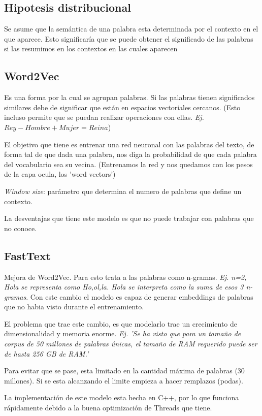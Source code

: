 \documentclass[titlepage,a4paper]{article}
\begin{document}
\subsection{Hipotesis distribucional}
Se asume que la semántica de una palabra esta determinada por el contexto en el que aparece. Esto significaría que se puede obtener el significado de las palabras si las resumimos en los contextos en las cuales aparecen


\subsection{Word2Vec}

Es una forma por la cual se agrupan palabras. Si las palabras tienen significados similares debe de significar que están en espacios vectoriales cercanos. (Esto incluso permite que se puedan realizar operaciones con ellas. \textit{Ej. $Rey - Hombre + Mujer = Reina$})

El objetivo que tiene es entrenar una red neuronal con las palabras del texto, de forma tal de que dada una palabra, nos diga la probabilidad de que cada palabra del vocabulario sea su vecina. (Entrenamos la red y nos quedamos con los pesos de la capa ocula, los 'word vectors')

\textit{Window size}: parámetro que determina el numero de palabras que define un contexto.

La desventajas que tiene este modelo es que no puede trabajar con palabras que no conoce. 

\subsection{FastText}
Mejora de Word2Vec. Para esto trata a las palabras como n-gramas. \textit{Ej. n=2, Hola se representa como Ho,ol,la. Hola se interpreta como la suma de esos 3 n-gramas}. Con este cambio el modelo es capaz de generar embeddings de palabras que no habia visto durante el entrenamiento.

El problema que trae este cambio, es que modelarlo trae un crecimiento de dimensionalidad y memoria enorme. \textit{Ej. 'Se ha visto que para un tamaño de corpus de 50 millones de palabras únicas, el tamaño de RAM requerido puede ser de hasta 256 GB de RAM.'}

Para evitar que se pase, esta limitado en la cantidad máxima de palabras (30 millones). Si se esta alcanzando el limite empieza a hacer remplazos (podas).

La implementación de este modelo esta hecha en C++, por lo que funciona rápidamente debido a la buena optimización de Threads que tiene.
\end{document}

